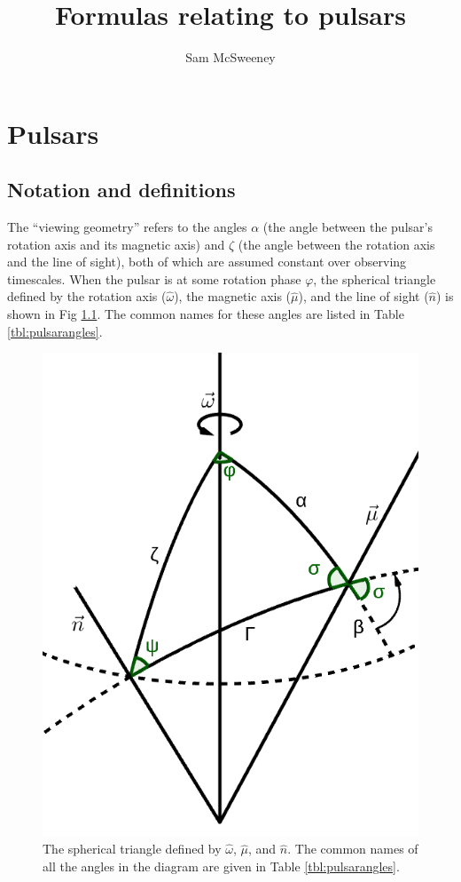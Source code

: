 \documentclass{book}
\title{Formulas relating to pulsars}
\author{Sam McSweeney}
\newcommand{\phase}{\varphi}
\begin{document}
\maketitle

\tableofcontents

\chapter{Pulsars}

\section{Notation and definitions}

The ``viewing geometry'' refers to the angles $\alpha$ (the angle between the pulsar's rotation axis and its magnetic axis) and $\zeta$ (the angle between the rotation axis and the line of sight), both of which are assumed constant over observing timescales. When the pulsar is at some rotation phase $\phase$, the spherical triangle defined by the rotation axis ($\hat{\omega}$), the magnetic axis ($\hat{\mu}$), and the line of sight ($\hat{n}$) is shown in Fig \ref{fig:pulsarangles}. The common names for these angles are listed in Table \ref{tbl:pulsarangles}.

\begin{figure}[!ht]
    \centering
    \includegraphics[scale=0.3]{images/pulsarangles.png}
    \caption{The spherical triangle defined by $\hat{\omega}$, $\hat{\mu}$, and $\hat{n}$. The common names of all the angles in the diagram are given in Table \ref{tbl:pulsarangles}.}
    \label{fig:pulsarangles}
\end{figure}
\end{document}
